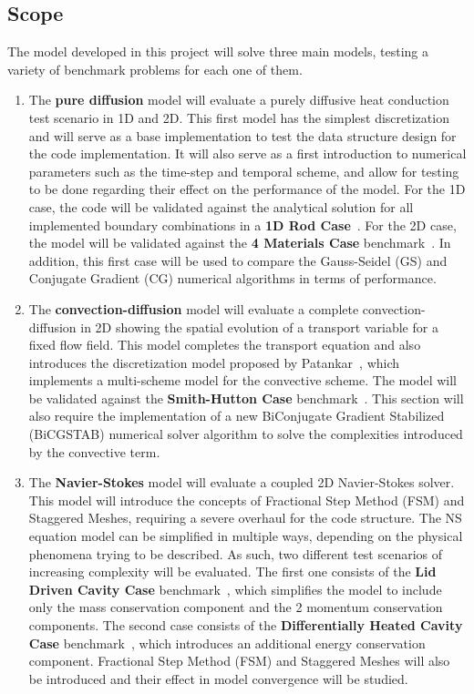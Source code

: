 \subsection*{Scope}
The model developed in this project will solve three main models, testing a variety of benchmark problems for each one of them.

\begin{enumerate}
    \item The \textbf{pure diffusion} model will evaluate a purely diffusive heat conduction test scenario in 1D and 2D. This first model has the simplest discretization and will serve as a base implementation to test the data structure design for the code implementation. It will also serve as a first introduction to numerical parameters such as the time-step and temporal scheme, and allow for testing to be done regarding their effect on the performance of the model. For the 1D case, the code will be validated against the analytical solution for all implemented boundary combinations in a \textbf{1D Rod Case}~\cite{FernandezOro}. For the 2D case, the model will be validated against the \textbf{4 Materials Case} benchmark~\cite{FernandezOro}. In addition, this first case will be used to compare the Gauss-Seidel (GS) and Conjugate Gradient (CG) numerical algorithms in terms of performance.
    \item The \textbf{convection-diffusion} model will evaluate a complete convection-diffusion in 2D showing the spatial evolution of a transport variable for a fixed flow field. This model completes the transport equation and also introduces the discretization model proposed by Patankar~\cite{Patankar}, which implements a multi-scheme model for the convective scheme. The model will be validated against the \textbf{Smith-Hutton Case} benchmark~\cite{SmithHutton1982}. This section will also require the implementation of a new BiConjugate Gradient Stabilized (BiCGSTAB) numerical solver algorithm to solve the complexities introduced by the convective term.
    \item The \textbf{Navier-Stokes} model will evaluate a coupled 2D Navier-Stokes solver. This model will introduce the concepts of Fractional Step Method (FSM) and Staggered Meshes, requiring a severe overhaul for the code structure. The NS equation model can be simplified in multiple ways, depending on the physical phenomena trying to be described. As such, two different test scenarios of increasing complexity will be evaluated. The first one consists of the \textbf{Lid Driven Cavity Case} benchmark~\cite{Ghia1982}, which simplifies the model to include only the mass conservation component and the 2 momentum conservation components. The second case consists of the \textbf{Differentially Heated Cavity Case} benchmark~\cite{deVahlDavis1983}, which introduces an additional energy conservation component. Fractional Step Method (FSM) and Staggered Meshes will also be introduced and their effect in model convergence will be studied.
\end{enumerate}

